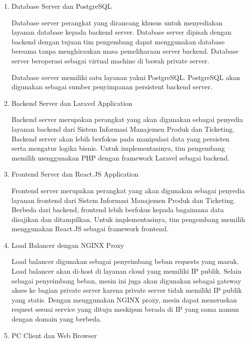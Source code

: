 \documentclass[12pt]{article}
\begin{document}
\begin{enumerate}[label=\textbf{4.\arabic*.}]
\begin{enumerate} [label=\textbf{4.3.\arabic*.}, wide, labelwidth=!, labelindent=0pt]
\begin{enumerate}[label=\arabic*.]
            \item Database Server dan PostgreSQL
            
            Database server perangkat yang dirancang khusus untuk menyediakan layanan database kepada backend server. Database server dipisah dengan backend dengan tujuan tim pengembang dapat menggunakan database bersama tanpa menghiraukan masa pemeliharaan server backend. Database server beroperasi sebagai virtual machine di bawah private server.
            
            Database server memiliki satu layanan yakni PostgreSQL. PostgreSQL akan digunakan sebagai sumber penyimpanan persistent backend server.

            \item Backend Server dan Laravel Application
            
            Backend server merupakan perangkat yang akan digunakan sebagai penyedia layanan backend dari Sistem Informasi Manajemen Produk dan Ticketing. Backend server akan lebih berfokus pada manipulasi data yang persisten serta mengatur logika bisnis. Untuk implementasinya, tim pengembang memilih menggunakan PHP dengan framework Laravel sebagai backend.
            
            \item Frontend Server dan React.JS Application
            
            Frontend server merupakan perangkat yang akan digunakan sebagai penyedia layanan frontend dari Sistem Informasi Manajemen Produk dan Ticketing. Berbeda dari backend, frontend lebih berfokus kepada bagaimana data disajikan dan ditampilkan. Untuk implementasinya, tim pengembang memilih menggunakan React.JS sebagai framework frontend.
            
            \item Load Balancer dengan NGINX Proxy
            
            Load balancer digunakan sebagai penyeimbang beban requests yang masuk. Load balancer akan di-host di layanan cloud yang memiliki IP publik. Selain sebagai penyeimbang beban, mesin ini juga akan digunakan sebagai gateway akses ke bagian private server karena private server tidak memiliki IP publik yang statis. Dengan menggunakan NGINX proxy, mesin dapat meneruskan request sesuai service yang dituju meskipun berada di IP yang sama namun dengan domain yang berbeda.

            \item PC Client dan Web Browser
            

\end{enumerate}
\end{enumerate}
\end{enumerate}
\end{document}
